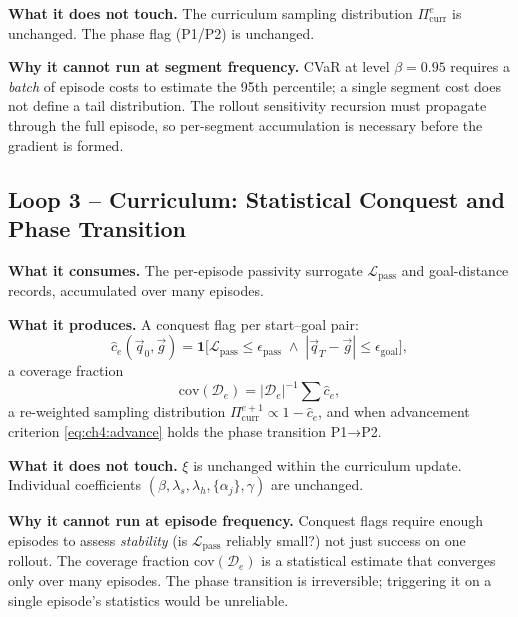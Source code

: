 \textbf{What it does not touch.}
The curriculum sampling distribution $\Pi_{\mathrm{curr}}^e$ is
unchanged.
The phase flag (P1/P2) is unchanged.

\textbf{Why it cannot run at segment frequency.}
CVaR at level $\beta=0.95$ requires a \emph{batch} of episode costs
to estimate the 95th percentile; a single segment cost does not
define a tail distribution.
The rollout sensitivity recursion must propagate through the full
episode, so per-segment accumulation is necessary before the gradient
is formed.

\subsection{Loop 3 -- Curriculum: Statistical Conquest and Phase Transition}
\label{subsec:ch4:curr_loop}

\textbf{What it consumes.}
The per-episode passivity surrogate $\mathcal{L}_{\mathrm{pass}}$
and goal-distance records, accumulated over many episodes.

\textbf{What it produces.}
A conquest flag per start–goal pair:
\begin{equation}
  \hat{c}_e(\vec{q}_0,\vec{g})
  = \mathbf{1}\!\bigl[
      \mathcal{L}_{\mathrm{pass}} \leq \epsilon_{\mathrm{pass}}
      \;\wedge\;
      |\vec{q}_T - \vec{g}| \leq \epsilon_{\mathrm{goal}}
    \bigr],
  \label{eq:ch4:conquest}
\end{equation}
a coverage fraction
\begin{equation}
  \mathrm{cov}(\mathcal{D}_e) = |\mathcal{D}_e|^{-1}\sum\hat{c}_e,
  \label{eq:ch4:coverage}
\end{equation}
a re-weighted sampling distribution
$\Pi_{\mathrm{curr}}^{e+1}\propto 1-\hat{c}_e$,
and when advancement criterion \eqref{eq:ch4:advance} holds  the
phase transition P1→P2.

\textbf{What it does not touch.}
$\xi$ is unchanged within the curriculum update.
Individual coefficients $(\beta,\lambda_s,\lambda_h,\{\alpha_j\},\gamma)$
are unchanged.

\textbf{Why it cannot run at episode frequency.}
Conquest flags require enough episodes to assess \emph{stability}
(is $\mathcal{L}_{\mathrm{pass}}$ reliably small?) not just success
on one rollout.
The coverage fraction $\mathrm{cov}(\mathcal{D}_e)$ is a statistical
estimate that converges only over many episodes.
The phase transition is irreversible; triggering it on a single
episode's statistics would be unreliable.

